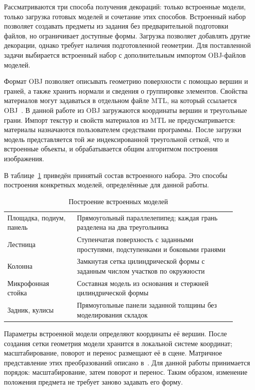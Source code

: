 Рассматриваются три способа получения декораций: только встроенные модели, только загрузка готовых моделей и сочетание этих способов. Встроенный набор позволяет создавать предметы из задания без предварительной подготовки файлов, но ограничивает доступные формы. Загрузка позволяет добавлять другие декорации, однако требует наличия подготовленной геометрии. Для поставленной задачи выбирается встроенный набор с дополнительным импортом OBJ-файлов моделей.

Формат OBJ позволяет описывать геометрию поверхности с помощью вершин и граней, а также хранить нормали и сведения о группировке элементов. Свойства материалов могут задаваться в отдельном файле MTL, на который ссылается OBJ~\cite{wavefront-obj}. В данной работе из OBJ загружаются координаты вершин и треугольные грани. Импорт текстур и свойств материалов из MTL не предусматривается: материалы назначаются пользователем средствами программы. После загрузки модель представляется той же индексированной треугольной сеткой, что и встроенные объекты, и обрабатывается общим алгоритмом построения изображения.

В таблице~\ref{tab:scene-geometry} приведён принятый состав встроенного набора. Это способы построения конкретных моделей, определённые для данной работы.

\begin{table}[H]
\caption{Построение встроенных моделей}
\label{tab:scene-geometry}
\centering
\begin{tabular}{|>{\raggedright\arraybackslash}p{0.28\linewidth}|>{\raggedright\arraybackslash}p{0.64\linewidth}|}
\hline
\multicolumn{1}{|c|}{Предмет} & \multicolumn{1}{c|}{Геометрия} \\
\hline
Площадка, подиум, панель & Прямоугольный параллелепипед; каждая грань разделена на два треугольника \\
\hline
Лестница & Ступенчатая поверхность с заданными проступями, подступенками и боковыми гранями \\
\hline
Колонна & Замкнутая сетка цилиндрической формы с заданным числом участков по окружности \\
\hline
Микрофонная стойка & Составная модель из основания и стержней цилиндрической формы \\
\hline
Задник, кулисы & Прямоугольные панели заданной толщины без моделирования складок \\
\hline
\end{tabular}
\end{table}

Параметры встроенной модели определяют координаты её вершин. После создания сетки геометрия модели хранится в локальной системе координат; масштабирование, поворот и перенос размещают её в сцене. Матричное представление этих преобразований описано в~\cite[разд.~3.9, 3.10]{pbrt4}. Для данной работы принимается порядок: масштабирование, затем поворот и перенос. Таким образом, изменение положения предмета не требует заново задавать его форму.

